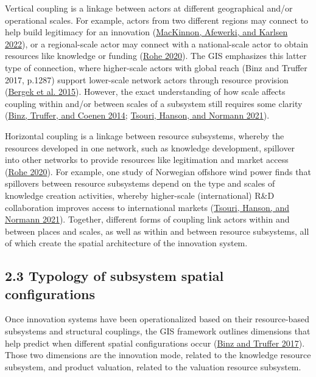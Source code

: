 \documentclass[twoside,12pt,final]{ucthesis-CA2012}
\begin{document}
\begin{ucmainmatter}
Vertical coupling is a linkage between actors at different geographical
and/or operational scales. For example, actors from two different
regions may connect to help build legitimacy for an innovation
(\protect\hyperlink{ref-MacKinnon_Afewerki_Karlsen_2022}{MacKinnon, Afewerki, and Karlsen 2022}),
or a regional-scale actor may connect with a national-scale actor to
obtain resources like knowledge or funding
(\protect\hyperlink{ref-Rohe_2020}{Rohe 2020}). The GIS
emphasizes this latter type of connection, where higher-scale actors
\textquotesingle with global reach\textquotesingle{} (Binz and Truffer 2017, p.1287) support
lower-scale network actors through resource provision
(\protect\hyperlink{ref-Bergek_Hekkert_Jacobsson_Markard_Sanduxe9n_Truffer_2015}{Bergek et al. 2015}).
However, the exact understanding of how scale affects coupling within
and/or between scales of a subsystem still requires some clarity
(\protect\hyperlink{ref-Binz_Truffer_Coenen_2014}{Binz, Truffer, and Coenen 2014}; \protect\hyperlink{ref-Tsouri_Hanson_Normann_2021}{Tsouri, Hanson, and Normann 2021}).

Horizontal coupling is a linkage between resource subsystems, whereby
the resources developed in one network, such as knowledge development,
spillover into other networks to provide resources like legitimation and
market access (\protect\hyperlink{ref-Rohe_2020}{Rohe 2020}).
For example, one study of Norwegian offshore wind power finds that
spillovers between resource subsystems depend on the type and scales of
knowledge creation activities, whereby higher-scale (international) R\&D
collaboration improves access to international markets
(\protect\hyperlink{ref-Tsouri_Hanson_Normann_2021}{Tsouri, Hanson, and Normann 2021}).
Together, different forms of coupling link actors within and between
places and scales, as well as within and between resource subsystems,
all of which create the spatial architecture of the innovation system.

\hypertarget{typology-of-subsystem-spatial-configurations}{%
\subsection{2.3 Typology of subsystem spatial configurations}\label{typology-of-subsystem-spatial-configurations}}

Once innovation systems have been operationalized based on their
resource-based subsystems and structural couplings, the GIS framework
outlines dimensions that help predict when different spatial
configurations occur
(\protect\hyperlink{ref-Binz_Truffer_2017}{Binz and Truffer 2017}). Those
two dimensions are the innovation mode, related to the knowledge
resource subsystem, and product valuation, related to the valuation
resource subsystem.


\end{ucmainmatter}
\end{document}
